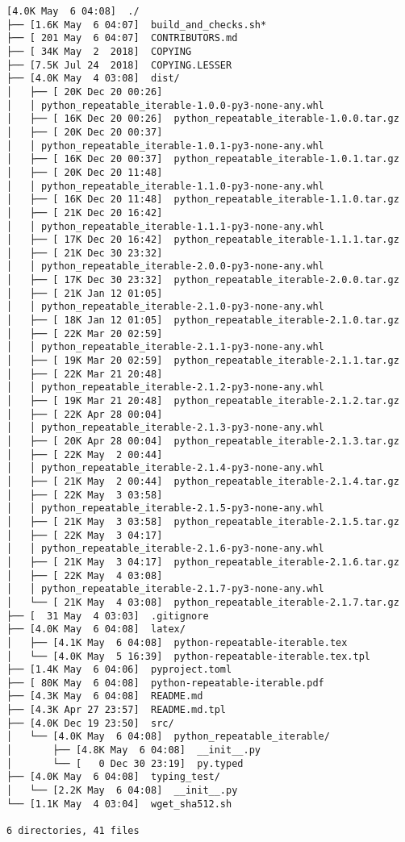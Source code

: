 \documentclass{article}
\begin{document}
\begin{verbatim}
[4.0K May  6 04:08]  ./
├── [1.6K May  6 04:07]  build_and_checks.sh*
├── [ 201 May  6 04:07]  CONTRIBUTORS.md
├── [ 34K May  2  2018]  COPYING
├── [7.5K Jul 24  2018]  COPYING.LESSER
├── [4.0K May  4 03:08]  dist/
│   ├── [ 20K Dec 20 00:26]
│   │ python_repeatable_iterable-1.0.0-py3-none-any.whl
│   ├── [ 16K Dec 20 00:26]  python_repeatable_iterable-1.0.0.tar.gz
│   ├── [ 20K Dec 20 00:37]
│   │ python_repeatable_iterable-1.0.1-py3-none-any.whl
│   ├── [ 16K Dec 20 00:37]  python_repeatable_iterable-1.0.1.tar.gz
│   ├── [ 20K Dec 20 11:48]
│   │ python_repeatable_iterable-1.1.0-py3-none-any.whl
│   ├── [ 16K Dec 20 11:48]  python_repeatable_iterable-1.1.0.tar.gz
│   ├── [ 21K Dec 20 16:42]
│   │ python_repeatable_iterable-1.1.1-py3-none-any.whl
│   ├── [ 17K Dec 20 16:42]  python_repeatable_iterable-1.1.1.tar.gz
│   ├── [ 21K Dec 30 23:32]
│   │ python_repeatable_iterable-2.0.0-py3-none-any.whl
│   ├── [ 17K Dec 30 23:32]  python_repeatable_iterable-2.0.0.tar.gz
│   ├── [ 21K Jan 12 01:05]
│   │ python_repeatable_iterable-2.1.0-py3-none-any.whl
│   ├── [ 18K Jan 12 01:05]  python_repeatable_iterable-2.1.0.tar.gz
│   ├── [ 22K Mar 20 02:59]
│   │ python_repeatable_iterable-2.1.1-py3-none-any.whl
│   ├── [ 19K Mar 20 02:59]  python_repeatable_iterable-2.1.1.tar.gz
│   ├── [ 22K Mar 21 20:48]
│   │ python_repeatable_iterable-2.1.2-py3-none-any.whl
│   ├── [ 19K Mar 21 20:48]  python_repeatable_iterable-2.1.2.tar.gz
│   ├── [ 22K Apr 28 00:04]
│   │ python_repeatable_iterable-2.1.3-py3-none-any.whl
│   ├── [ 20K Apr 28 00:04]  python_repeatable_iterable-2.1.3.tar.gz
│   ├── [ 22K May  2 00:44]
│   │ python_repeatable_iterable-2.1.4-py3-none-any.whl
│   ├── [ 21K May  2 00:44]  python_repeatable_iterable-2.1.4.tar.gz
│   ├── [ 22K May  3 03:58]
│   │ python_repeatable_iterable-2.1.5-py3-none-any.whl
│   ├── [ 21K May  3 03:58]  python_repeatable_iterable-2.1.5.tar.gz
│   ├── [ 22K May  3 04:17]
│   │ python_repeatable_iterable-2.1.6-py3-none-any.whl
│   ├── [ 21K May  3 04:17]  python_repeatable_iterable-2.1.6.tar.gz
│   ├── [ 22K May  4 03:08]
│   │ python_repeatable_iterable-2.1.7-py3-none-any.whl
│   └── [ 21K May  4 03:08]  python_repeatable_iterable-2.1.7.tar.gz
├── [  31 May  4 03:03]  .gitignore
├── [4.0K May  6 04:08]  latex/
│   ├── [4.1K May  6 04:08]  python-repeatable-iterable.tex
│   └── [4.0K May  5 16:39]  python-repeatable-iterable.tex.tpl
├── [1.4K May  6 04:06]  pyproject.toml
├── [ 80K May  6 04:08]  python-repeatable-iterable.pdf
├── [4.3K May  6 04:08]  README.md
├── [4.3K Apr 27 23:57]  README.md.tpl
├── [4.0K Dec 19 23:50]  src/
│   └── [4.0K May  6 04:08]  python_repeatable_iterable/
│       ├── [4.8K May  6 04:08]  __init__.py
│       └── [   0 Dec 30 23:19]  py.typed
├── [4.0K May  6 04:08]  typing_test/
│   └── [2.2K May  6 04:08]  __init__.py
└── [1.1K May  4 03:04]  wget_sha512.sh

6 directories, 41 files
\end{verbatim}
\end{document}
